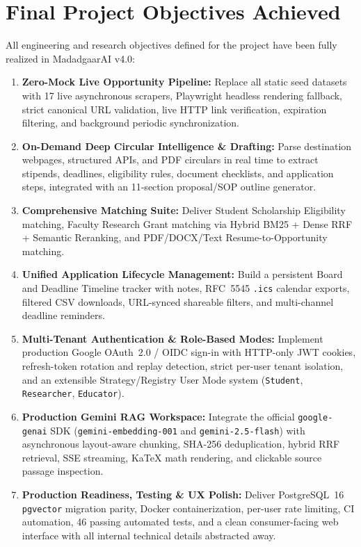 \documentclass[12pt,a4paper,oneside]{report}
\begin{document}
\section{Final Project Objectives Achieved}
All engineering and research objectives defined for the project have been fully realized in MadadgaarAI v4.0:
\begin{enumerate}[itemsep=3pt]
    \item \textbf{Zero-Mock Live Opportunity Pipeline:} Replace all static seed datasets with 17 live asynchronous scrapers, Playwright headless rendering fallback, strict canonical URL validation, live HTTP link verification, expiration filtering, and background periodic synchronization.
    \item \textbf{On-Demand Deep Circular Intelligence \& Drafting:} Parse destination webpages, structured APIs, and PDF circulars in real time to extract stipends, deadlines, eligibility rules, document checklists, and application steps, integrated with an 11-section proposal/SOP outline generator.
    \item \textbf{Comprehensive Matching Suite:} Deliver Student Scholarship Eligibility matching, Faculty Research Grant matching via Hybrid BM25 + Dense RRF + Semantic Reranking, and PDF/DOCX/Text Resume-to-Opportunity matching.
    \item \textbf{Unified Application Lifecycle Management:} Build a persistent Board and Deadline Timeline tracker with notes, RFC~5545 \texttt{.ics} calendar exports, filtered CSV downloads, URL-synced shareable filters, and multi-channel deadline reminders.
    \item \textbf{Multi-Tenant Authentication \& Role-Based Modes:} Implement production Google OAuth~2.0 / OIDC sign-in with HTTP-only JWT cookies, refresh-token rotation and replay detection, strict per-user tenant isolation, and an extensible Strategy/Registry User Mode system (\texttt{Student}, \texttt{Researcher}, \texttt{Educator}).
    \item \textbf{Production Gemini RAG Workspace:} Integrate the official \texttt{google-genai} SDK (\texttt{gemini-embedding-001} and \texttt{gemini-2.5-flash}) with asynchronous layout-aware chunking, SHA-256 deduplication, hybrid RRF retrieval, SSE streaming, KaTeX math rendering, and clickable source passage inspection.
    \item \textbf{Production Readiness, Testing \& UX Polish:} Deliver PostgreSQL~16 \texttt{pgvector} migration parity, Docker containerization, per-user rate limiting, CI automation, 46 passing automated tests, and a clean consumer-facing web interface with all internal technical details abstracted away.
\end{enumerate}
\end{document}
